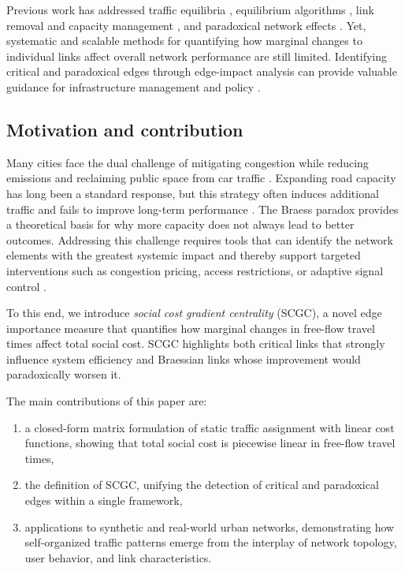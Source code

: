 \documentclass[twocolumn,english,groupedaddress, superscriptaddress,aps,pre,10pt,floatfix]{revtex4-2}
\begin{document}
Previous work has addressed traffic equilibria \citep{sheffi1985urban, patriksson1994traffic, florian1995network, smith1979existence}, equilibrium algorithms \citep{leblanc1975efficient, bargera2002origin, dial2006path}, link removal and capacity management \citep{nagurney2000emission, nagurney2009efficiency, jenelius2006importance}, and paradoxical network effects \citep{braess1968paradoxon, steinberg1983prevalence, pas1997braess, passacantando2021braess}. Yet, systematic and scalable methods for quantifying how marginal changes to individual links affect overall network performance are still limited. Identifying critical and paradoxical edges through edge-impact analysis can provide valuable guidance for infrastructure management and policy \citep{jenelius2006importance, nagurney2009efficiency}.

\subsection{Motivation and contribution}

Many cities face the dual challenge of mitigating congestion while reducing emissions and reclaiming public space from car traffic \citep{newman2015end, creutzig2015transport}. Expanding road capacity has long been a standard response, but this strategy often induces additional traffic and fails to improve long-term performance \citep{downs1962law, duranton2011fundamental}. The Braess paradox provides a theoretical basis for why more capacity does not always lead to better outcomes. Addressing this challenge requires tools that can identify the network elements with the greatest systemic impact and thereby support targeted interventions such as congestion pricing, access restrictions, or adaptive signal control \citep{yang2005roadpricing, small2007economics, depalma2011congestion}.

To this end, we introduce \emph{social cost gradient centrality} (SCGC), a novel edge importance measure that quantifies how marginal changes in free-flow travel times affect total social cost. SCGC highlights both critical links that strongly influence system efficiency and Braessian links whose improvement would paradoxically worsen it.

The main contributions of this paper are:
\begin{enumerate}
    \item a closed-form matrix formulation of static traffic assignment with linear cost functions, showing that total social cost is piecewise linear in free-flow travel times,
    \item the definition of SCGC, unifying the detection of critical and paradoxical edges within a single framework,
    \item applications to synthetic and real-world urban networks, demonstrating how self-organized traffic patterns emerge from the interplay of network topology, user behavior, and link characteristics. 
\end{enumerate}
\end{document}
